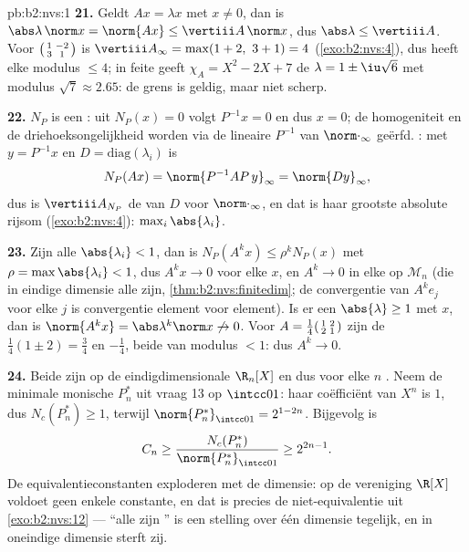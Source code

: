 \begin{solution}{pb:b2:nvs:1}
\textbf{21.} Geldt $Ax = \lambda x$ met $x \neq 0$, dan is
$\abs\lambda\,\norm x = \norm{Ax} \leq \vertiii A\,\norm x$, dus
$\abs\lambda \leq \vertiii A$. Voor $\begin{psmallmatrix}1 & -2\\
3 & 1\end{psmallmatrix}$ is $\vertiii A_\infty = \max(1 + 2,\ 3 +
1) = 4$ (\cref{exo:b2:nvs:4}), dus heeft elke  modulus
$\leq 4$; in feite geeft $\chi_A = X^2 - 2X + 7$ de 
$\lambda = 1 \pm \iu\sqrt6$ met modulus $\sqrt7 \approx 2.65$: de
grens is geldig, maar niet scherp.

\textbf{22.} $N_P$ is een : uit $N_P(x) = 0$ volgt $P^{-1}x =
0$ en dus $x = 0$; de homogeniteit en de driehoeksongelijkheid
worden via de lineaire $P^{-1}$ van $\norm\cdot_\infty$ geërfd.
: met $y = P^{-1}x$ en $D = \mathrm{diag}(\lambda_i)$
is
\[
N_P(Ax) = \norm{P^{-1}AP\,y}_\infty = \norm{Dy}_\infty,
\]
dus is $\vertiii A_{N_P}$ de  van $D$ voor
$\norm\cdot_\infty$, en dat is haar grootste absolute rijsom
(\cref{exo:b2:nvs:4}): $\max_i\abs{\lambda_i}$.

\textbf{23.} Zijn alle $\abs{\lambda_i} < 1$, dan is $N_P(A^kx)
\leq \rho^kN_P(x)$ met $\rho = \max\abs{\lambda_i} < 1$, dus $A^kx
\to 0$ voor elke $x$, en $A^k \to 0$ in elke  op
$\mathcal{M}_n$ (die in eindige dimensie alle  zijn,
\cref{thm:b2:nvs:finitedim}; de convergentie van $A^ke_j$ voor elke
$j$ is convergentie element voor element). Is er een
$\abs{\lambda} \geq 1$ met  $x$, dan is $\norm{A^kx} =
\abs\lambda^k\norm x \not\to 0$. Voor $A =
\frac14\begin{psmallmatrix}1 & 2\\ 2 & 1\end{psmallmatrix}$ zijn de
 $\frac14(1 \pm 2) = \frac34$ en $-\frac14$, beide van
modulus $< 1$: dus $A^k \to 0$.

\textbf{24.} Beide zijn  op de eindigdimensionale
$\R_n[X]$ en dus voor elke $n$ . Neem de minimale
monische $P^*_n$ uit vraag 13 op $\intcc01$: haar coëfficiënt van
$X^n$ is $1$, dus $N_c(P^*_n) \geq 1$, terwijl
$\norm{P^*_n}_{\intcc01} = 2^{1-2n}$. Bijgevolg is
\[
C_n \geq \frac{N_c(P^*_n)}{\norm{P^*_n}_{\intcc01}}
\geq 2^{2n-1} .
\]
De equivalentieconstanten exploderen met de dimensie: op de
vereniging $\R[X]$ voldoet geen enkele constante, en dat is precies
de niet-equivalentie uit \cref{exo:b2:nvs:12} --- ``alle 
zijn '' is een stelling over één dimensie tegelijk, en in
oneindige dimensie sterft zij.


\end{solution}
